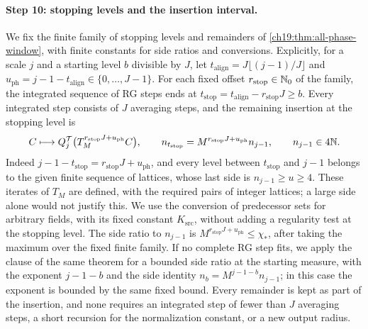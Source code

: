 \paragraph{Step 10: stopping levels and the insertion interval.}
We fix the finite family of stopping levels and remainders of \cref{ch19:thm:all-phase-window}, with finite constants for side ratios and conversions. Explicitly, for a scale $j$ and a starting level $b$ divisible by $J$, let $t_{\mathrm{align}}=J\lfloor(j-1)/J\rfloor$ and $u_{\mathrm{ph}}=j-1-t_{\mathrm{align}}\in\{0,\dots,J-1\}$. For each fixed offset $r_{\mathrm{stop}}\in\mathbb N_0$ of the family, the integrated sequence of RG steps ends at $t_{\mathrm{stop}}=t_{\mathrm{align}}-r_{\mathrm{stop}}J\ge b$. Every integrated step consists of $J$ averaging steps, and the remaining insertion at the stopping level is
\begin{equation}\label{ch20:eq:full-macro-source-phase}
 C\longmapsto Q_j^{\mathcal T}\bigl(T_M^{r_{\mathrm{stop}}J+u_{\mathrm{ph}}}C\bigr),\qquad
 n_{t_{\mathrm{stop}}}=M^{r_{\mathrm{stop}}J+u_{\mathrm{ph}}}n_{j-1},\qquad n_{j-1}\in4\mathbb N.
\end{equation}
Indeed $j-1-t_{\mathrm{stop}}=r_{\mathrm{stop}}J+u_{\mathrm{ph}}$, and every level between $t_{\mathrm{stop}}$ and $j-1$ belongs to the given finite sequence of lattices, whose last side is $n_{j-1}\ge u\ge4$. These iterates of $T_M$ are defined, with the required pairs of integer lattices; a large side alone would not justify this. We use the conversion of predecessor sets for arbitrary fields, with its fixed constant $K_{\mathrm{src}}$, without adding a regularity test at the stopping level. The side ratio to $n_{j-1}$ is $M^{r_{\mathrm{stop}}J+u_{\mathrm{ph}}}\le\chi_*$, after taking the maximum over the fixed finite family. If no complete RG step fits, we apply the clause of the same theorem for a bounded side ratio at the starting measure, with the exponent $j-1-b$ and the side identity $n_b=M^{j-1-b}n_{j-1}$; in this case the exponent is bounded by the same fixed bound. Every remainder is kept as part of the insertion, and none requires an integrated step of fewer than $J$ averaging steps, a short recursion for the normalization constant, or a new output radius.

